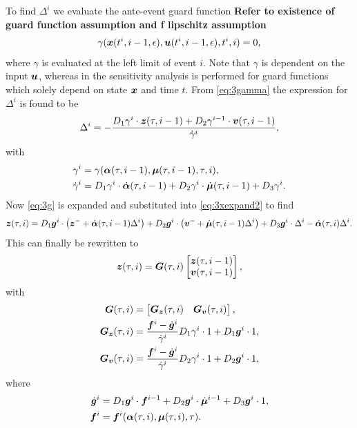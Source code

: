 \documentclass[../DC2017114Bouma.tex]{subfiles}
\begin{document}
To find $\Delta^{i}$ we evaluate the ante-event guard function
\textbf{Refer to existence of guard function assumption and f lipschitz assumption}
\begin{align}
\gamma({\boldsymbol{x}}(t^{i},i-1,\epsilon),{\boldsymbol{u}}(t^{i},i-1,\epsilon),t^{i},i) = 0,\label{eq:3gamma}
\end{align}
where $\gamma$ is evaluated at the left limit of event $i$. Note that $\gamma$ is dependent on the input ${\boldsymbol{u}}$, whereas in \cite{Chen2018a} the sensitivity analysis is performed for guard functions which solely depend on state ${\boldsymbol{x}}$ and time $t$. From \eqref{eq:3gamma} the expression for $\Delta^{i}$ is found to be
\begin{align}
\Delta^{i} = -\frac{D_1\gamma^{i}\cdot{\boldsymbol{z}}(\tau,i-1) + D_2\gamma^{i-1}\cdot{\boldsymbol{v}}(\tau,i-1)}{\dot{\gamma}^{i}},\label{eq}
\end{align}
with
\begin{align}
\gamma^i &= \gamma(\boldsymbol{\alpha}(\tau,i-1),\boldsymbol{\mu}(\tau,i-1),\tau,i),\\
\dot{\gamma}^i &= D_1\gamma^i\cdot\dot{\boldsymbol{\alpha}}(\tau,i-1) + D_2\gamma^i\cdot\dot{\boldsymbol{\mu}}(\tau,i-1) + D_3\gamma^i.
\end{align}
Now \eqref{eq:3g} is expanded and substituted  into \eqref{eq:3xexpand2} to find
\begin{align}
{\boldsymbol{z}}(\tau,i) = D_1{\boldsymbol{g}}^i\cdot\left({\boldsymbol{z}}^- + \dot{\boldsymbol{\alpha}}(\tau,i-1)\Delta^i\right) + D_2{\boldsymbol{g}}^i\cdot\left({\boldsymbol{v}}^- + \dot{\boldsymbol{\mu}}(\tau,i-1)\Delta^i\right) + D_3{\boldsymbol{g}}^i\cdot\Delta^i - \dot{\boldsymbol{\alpha}}(\tau,i)\Delta^i.
\end{align}
This can finally be rewritten to
\begin{align}
{\boldsymbol{z}}(\tau,i) = {\boldsymbol{G}}(\tau,i)\begin{bmatrix}
{\boldsymbol{z}}(\tau,i-1) \\ {\boldsymbol{v}}(\tau,i-1)
\end{bmatrix},
\end{align}
with 
\begin{align}
{\boldsymbol{G}}(\tau,i) &= \begin{bmatrix}
{\boldsymbol{G}}_{{\boldsymbol{z}}}(\tau,i) & {\boldsymbol{G}}_{{\boldsymbol{v}}}(\tau,i)
\end{bmatrix},\\
{\boldsymbol{G}}_{{\boldsymbol{z}}}(\tau,i) & = \frac{{\boldsymbol{f}}^i - \dot{{\boldsymbol{g}}}^i}{\dot{\gamma}^i}D_1\gamma^i\cdot 1 + D_1{\boldsymbol{g}}^i\cdot 1,\\
{\boldsymbol{G}}_{{\boldsymbol{v}}}(\tau,i) & = \frac{{\boldsymbol{f}}^i - \dot{{\boldsymbol{g}}}^i}{\dot{\gamma}^i}D_2\gamma^i\cdot 1 + D_2{\boldsymbol{g}}^i\cdot 1,
\end{align}
where
\begin{align}
\dot{{\boldsymbol{g}}}^i &= D_1{\boldsymbol{g}}^i\cdot {\boldsymbol{f}}^{i-1} + D_2{\boldsymbol{g}}^i\cdot \dot{\boldsymbol{\mu}}^{i-1} + D_3{\boldsymbol{g}}^i\cdot 1,\\
{\boldsymbol{f}}^i &= {\boldsymbol{f}}^i(\boldsymbol{\alpha}(\tau,i),\boldsymbol{\mu}(\tau,i),\tau).
\end{align}
\end{document}

